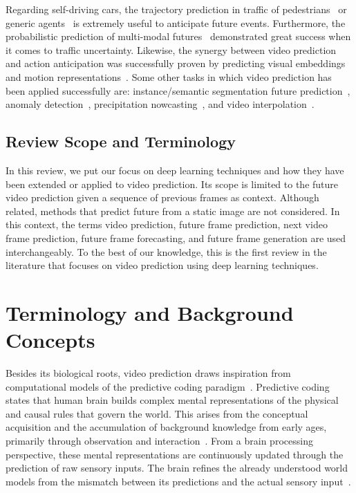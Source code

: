 Regarding self-driving cars, the trajectory prediction in traffic of pedestrians~\cite{Bhattacharyya2018} or generic agents~\cite{Choi2020} is extremely useful to anticipate future events. Furthermore, the probabilistic prediction of multi-modal futures~\cite{Hu2020} demonstrated great success when it comes to traffic uncertainty. Likewise, the synergy between video prediction and action anticipation was successfully proven by predicting visual embeddings~\cite{Gammulle2019} and motion representations~\cite{Opazo2018}. Some other tasks in which video prediction has been applied successfully are: instance/semantic segmentation future prediction~\cite{Luc2018,Bhattacharyya2019,Terwilliger2019}, anomaly detection~\cite{Liu2018a}, precipitation nowcasting~\cite{Shi2015,Shi2017}, and video interpolation~\cite{Liu2017}.

\subsection{Review Scope and Terminology}
In this review, we put our focus on deep learning techniques and how they have been extended or applied to video prediction. Its scope is limited to the future video prediction given a sequence of previous frames as context. Although related, methods that predict future from a static image are not considered. In this context, the terms
video prediction, future frame prediction, next video frame prediction, future frame forecasting, and future frame generation are used interchangeably. To the best of our knowledge, this is the first review in the literature that focuses on video prediction using deep learning techniques.


\section{Terminology and Background Concepts}
\label{sec:video_prediction}
Besides its biological roots, video prediction draws inspiration from computational models of the predictive coding paradigm~\cite{Softky1995,Rao1999,Deco2001,Hollingworth2004}. Predictive coding states that human brain builds complex mental representations of the physical and causal rules that govern the world. This arises from the conceptual acquisition and the accumulation of background knowledge from early ages, primarily through observation and interaction~\cite{Cleeremans1991,Cleeremans1993,Baker2014}. From a brain processing perspective, these mental representations are continuously updated through the prediction of raw sensory inputs. The brain refines the already understood world models from the mismatch between its predictions and the actual sensory input~\cite{Ouden2012}.

